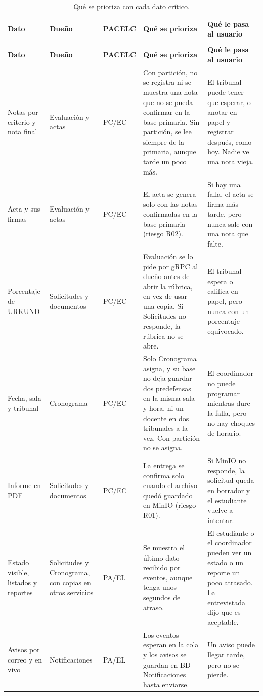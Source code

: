 \begingroup
\footnotesize
\begin{xltabular}{\textwidth}{@{}>{\raggedright\arraybackslash}p{2.4cm} >{\raggedright\arraybackslash}p{2.2cm} >{\raggedright\arraybackslash}p{1.5cm} >{\raggedright\arraybackslash}X >{\raggedright\arraybackslash}p{3.6cm}@{}}
    \caption{Qué se prioriza con cada dato crítico.}
    \label{tab:pacelc} \\
    \toprule
    \textbf{Dato} & \textbf{Dueño} & \textbf{PACELC} & \textbf{Qué se prioriza} & \textbf{Qué le pasa al usuario} \\
    \midrule
    \endfirsthead
     \\
    \toprule
    \textbf{Dato} & \textbf{Dueño} & \textbf{PACELC} & \textbf{Qué se prioriza} & \textbf{Qué le pasa al usuario} \\
    \midrule
    \endhead
    \bottomrule
    \endlastfoot
    Notas por criterio y nota final & Evaluación y actas & PC/EC & Con partición, no se registra ni se muestra una nota que no se pueda confirmar en la base primaria. Sin partición, se lee siempre de la primaria, aunque tarde un poco más. & El tribunal puede tener que esperar, o anotar en papel y registrar después, como hoy. Nadie ve una nota vieja. \\
    \addlinespace
    Acta y sus firmas & Evaluación y actas & PC/EC & El acta se genera solo con las notas confirmadas en la base primaria (riesgo R02). & Si hay una falla, el acta se firma más tarde, pero nunca sale con una nota que falte. \\
    \addlinespace
    Porcentaje de URKUND & Solicitudes y documentos & PC/EC & Evaluación se lo pide por gRPC al dueño antes de abrir la rúbrica, en vez de usar una copia. Si Solicitudes no responde, la rúbrica no se abre. & El tribunal espera o califica en papel, pero nunca con un porcentaje equivocado. \\
    \addlinespace
    Fecha, sala y tribunal & Cronograma & PC/EC & Solo Cronograma asigna, y su base no deja guardar dos predefensas en la misma sala y hora, ni un docente en dos tribunales a la vez. Con partición no se asigna. & El coordinador no puede programar mientras dure la falla, pero no hay choques de horario. \\
    \addlinespace
    Informe en PDF & Solicitudes y documentos & PC/EC & La entrega se confirma solo cuando el archivo quedó guardado en MinIO (riesgo R01). & Si MinIO no responde, la solicitud queda en borrador y el estudiante vuelve a intentar. \\
    \addlinespace
    Estado visible, listados y reportes & Solicitudes y Cronograma, con copias en otros servicios & PA/EL & Se muestra el último dato recibido por eventos, aunque tenga unos segundos de atraso. & El estudiante o el coordinador pueden ver un estado o un reporte un poco atrasado. La entrevistada dijo que es aceptable. \\
    \addlinespace
    Avisos por correo y en vivo & Notificaciones & PA/EL & Los eventos esperan en la cola y los avisos se guardan en BD Notificaciones hasta enviarse. & Un aviso puede llegar tarde, pero no se pierde. \\
\end{xltabular}
\endgroup

